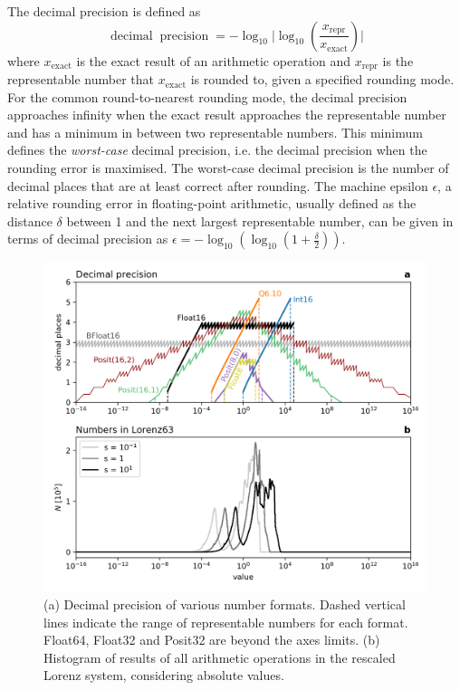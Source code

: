 \documentclass[draft]{agujournal2019}
\newcommand{\op}{\operatorname}
\begin{document}
The decimal precision is defined as \cite{Gustafson2017,Gustafson2017a}
\begin{equation}
\op{decimal} \op{precision} = -\log_{10} \vert \log_{10}( \frac{x_\text{repr}}{x_\text{exact}} ) \vert
\end{equation}
where $x_\text{exact}$ is the exact result of an arithmetic operation and $x_\text{repr}$ is the representable number that $x_\text{exact}$ is rounded to, given a specified rounding mode. For the common round-to-nearest rounding mode, the decimal precision approaches infinity when the exact result approaches the representable number and has a minimum in between two representable numbers. This minimum defines the \emph{worst-case} decimal precision, i.e. the decimal precision when the rounding error is maximised. The worst-case decimal precision is the number of decimal places that are at least correct after rounding. The machine epsilon $\epsilon$, a relative rounding error in floating-point arithmetic, usually defined as the distance $\delta$ between 1 and the next largest representable number, can be given in terms of decimal precision as $\epsilon = -\log_{10} ( \log_{10}( 1 + \frac{\delta}{2} ))$.


\begin{figure}[htbp]
\includegraphics[width=1\textwidth]{../plots/decimal_precision.png}
\caption{(a) Decimal precision of various number formats. Dashed vertical lines indicate the range of representable numbers for each format. Float64, Float32 and Posit32 are beyond the axes limits. (b) Histogram of results of all arithmetic operations in the rescaled Lorenz system, considering absolute values.}
\label{fig:dec_prec}
\end{figure}
\end{document}
